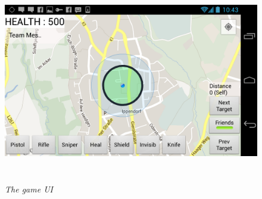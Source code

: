 \documentclass{article}
\begin{document}
\begin{figure}
\includegraphics[height=3.5in,width=6.23in]{./images/android_screenshots/second_development/game_second_development_5.png}
\caption{\small \sl The game UI \label{fig:game_ui2}}
\end{figure}
\end{document}
